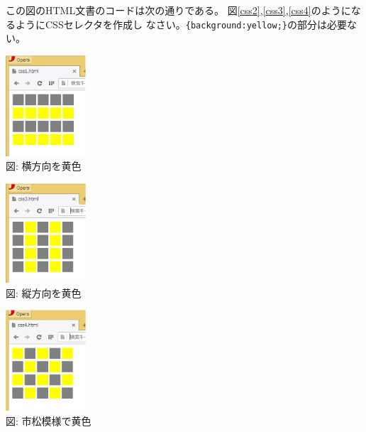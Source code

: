 \documentclass[a4j,12pt]{jreport}
\begin{document}
\begin{Prob}
 この図のHTML文書のコードは次の通りである。
  {\footnotesize
 }
 図\ref{css2},\ref{css3},\ref{css4}のようになるようにCSSセレクタを作成し
 なさい。\verb+{background:yellow;}+の部分は必要ない。\\
\begin{minipage}{0.3\textwidth}
\begin{center}
 \includegraphics[width=3cm]{css2.eps}\\
 図\thefigure : {横方向を黄色}\label{css2}
\end{center}     
 \end{minipage}
\begin{minipage}{0.3\textwidth}
\begin{center}
 \includegraphics[width=3cm]{css3.eps}\\
 図\thefigure : {縦方向を黄色}\label{css3}
\end{center}     
 \end{minipage}
\begin{minipage}{0.3\textwidth}
\begin{center}
 \includegraphics[width=3cm]{css4.eps}\\
 図\thefigure : {市松模様で黄色}\label{css4}
\end{center}     
 \end{minipage}
\end{Prob}
\end{document}
